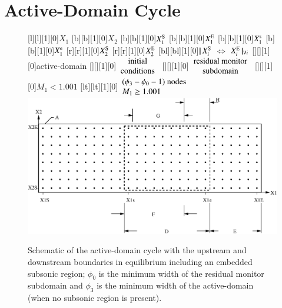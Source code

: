 \documentclass{warpdoc}
\newcommand{\loope}{{\rm e}}
\newcommand{\loops}{{\rm s}}
\newcommand{\loopE}{{\rm E}}
\newcommand{\loopS}{{\rm S}}
\newcommand{\fontfig}{\footnotesize}
\newcommand\subdomain[3]{$ | \! | \, #2 $ $\Leftrightarrow$ $#3 \, | \! |_{#1}$}
\begin{document}
\section{Active-Domain Cycle}
\label{section:active_domain}


%
\begin{figure}[t]
 \begin{center}
   \fontfig
   [l][l][1][0]{$X_1$}
   [b][b][1][0]{$X_2$}
   [b][b][1][0]{$X_1^\loopS$}
   [b][b][1][0]{$X_1^\loopE$}
   [b][b][1][0]{$X_1^\loops$}
   [b][b][1][0]{$X_1^\loope$}
   [r][r][1][0]{$X_2^\loopS$}
   [r][r][1][0]{$X_2^\loopE$}
   [bl][bl][1][0]{\subdomain{\forall i}{X_i^\loopS}{X_i^\loopE}}
   [][][1][0]{active-domain}
   [][][1][0]{$\begin{array}{c}\rm initial \\ \rm conditions\end{array}$}
   [][][1][0]{$\begin{array}{c}\rm residual~monitor\\ \rm subdomain\end{array}$}
   [][][1][0]{$M_1<1.001$}
   [lt][lt][1][0]{$\begin{array}{l} (\phi_3-\phi_0-1) {\rm ~ nodes} \\ M_1\geq 1.001\end{array}$}
   \includegraphics[width=4.7in]{ParentFig4.eps}
 \end{center}
\caption{Schematic of the active-domain cycle with the upstream and downstream boundaries
         in equilibrium including an embedded subsonic region; $\phi_0$ is the minimum
         width of the residual monitor subdomain and $\phi_3$ is the minimum width
         of the active-domain (when no subsonic region is present).}
\label{fig:active-domain}
\end{figure}
%
\end{document}
